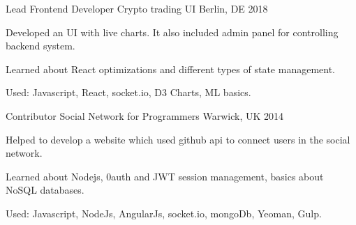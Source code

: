 

\begin{cventries}


  \cventry
  {Lead Frontend Developer} %
  {Crypto trading UI} %
  {Berlin, DE} %
  {2018} %
  {
  \begin{cvitems} %
    \item {Developed an UI with live charts. It also included admin panel for controlling backend system.}
    \item {Learned about React optimizations and different types of state management.}
    \item {Used: Javascript, React, socket.io, D3 Charts, ML basics.}
  \end{cvitems}
  }

  \cventry
    {Contributor} %
    {Social Network for Programmers} %
    {Warwick, UK} %
    {2014} %
    {
      \begin{cvitems} %
        \item {Helped to develop a website which used github api to connect users in the social network.}
        \item {Learned about Nodejs, 0auth and JWT session management, basics about NoSQL databases.}
        \item {Used: Javascript, NodeJs, AngularJs, socket.io, mongoDb, Yeoman, Gulp.}
      \end{cvitems}
    }


\end{cventries}
